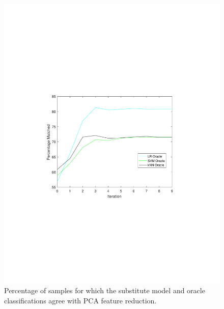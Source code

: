\begin{figure}
\begin{minipage}{0.42\linewidth}
		\includegraphics[width =\linewidth, trim = 110 240 120 255, clip]{figs/fig1_pca.pdf}
		\caption{Percentage of samples for which the substitute model and oracle classifications agree with PCA feature reduction.}
		\label{fig:sub_approx_pca}
	\end{minipage}
\end{figure}

